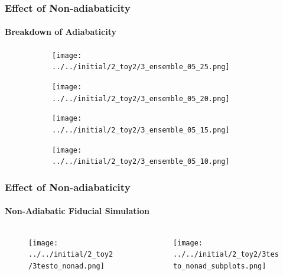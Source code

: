 \documentclass[dvipsnames]{beamer}
\begin{document}
\begin{frame}
    \frametitle{Effect of Non-adiabaticity}
    \framesubtitle{Breakdown of Adiabaticity}
    \begin{figure}[t]
        \centering
        \begin{subfigure}{0.45\textwidth}
            \centering
            \texttt{[image: ../../initial/2\_toy2/3\_ensemble\_05\_25.png]}
        \end{subfigure}
        \begin{subfigure}{0.45\textwidth}
            \centering
            \texttt{[image: ../../initial/2\_toy2/3\_ensemble\_05\_20.png]}
        \end{subfigure}

        \begin{subfigure}{0.45\textwidth}
            \centering
            \texttt{[image: ../../initial/2\_toy2/3\_ensemble\_05\_15.png]}
        \end{subfigure}
        \begin{subfigure}{0.45\textwidth}
            \centering
            \texttt{[image: ../../initial/2\_toy2/3\_ensemble\_05\_10.png]}
        \end{subfigure}
    \end{figure}
\end{frame}

\begin{frame}
    \frametitle{Effect of Non-adiabaticity}
    \framesubtitle{Non-Adiabatic Fiducial Simulation}

    \begin{columns}
        \begin{column}{0.5\textwidth}
            \begin{figure}[t]
                \centering
                \texttt{[image: ../../initial/2\_toy2/3testo\_nonad.png]}
            \end{figure}
        \end{column}
        \begin{column}{0.5\textwidth}
            \begin{figure}[t]
                \centering
                \texttt{[image: ../../initial/2\_toy2/3testo\_nonad\_subplots.png]}
            \end{figure}
        \end{column}
    \end{columns}
\end{frame}
\end{document}
